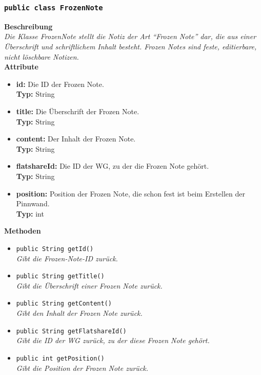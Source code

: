 \subsubsection{\texttt{public class FrozenNote}}

	\textbf{Beschreibung} \\
	\textit{Die Klasse FrozenNote stellt die Notiz der Art “Frozen Note” dar, die aus einer Überschrift und schriftlichem Inhalt besteht. Frozen Notes sind feste, editierbare, nicht löschbare Notizen.} \\
	
	\textbf{Attribute}
	\begin{itemize}
		\item \textbf{id:} Die ID der Frozen Note. \\
		\textbf{Typ:} String
		\item \textbf{title:} Die Überschrift der Frozen Note. \\
		\textbf{Typ:} String
		\item \textbf{content:} Der Inhalt der Frozen Note. \\
		\textbf{Typ:} String
		\item \textbf{flatshareId:} Die ID der WG, zu der die Frozen Note gehört. \\
		\textbf{Typ:} String
		\item \textbf{position:} Position der Frozen Note, die schon fest ist beim Erstellen der Pinnwand.\\
		\textbf{Typ:} int
	\end{itemize}
	
	\textbf{Methoden}
	\begin{itemize}
		\item\texttt{{public String getId()}}\\
		\textit{Gibt die Frozen-Note-ID zurück.}\\
		
		\item\texttt{{public String getTitle()}}\\
		\textit{Gibt die Überschrift einer Frozen Note zurück.}\\
		
		\item\texttt{{public String getContent()}}\\
		\textit{Gibt den Inhalt der Frozen Note zurück.}\\
		
		\item\texttt{{public String getFlatshareId()}}\\
		\textit{Gibt die ID der WG zurück, zu der diese Frozen Note gehört.}\\
		
		\item\texttt{{public int getPosition()}}\\
		\textit{Gibt die Position der Frozen Note zurück.}\\
	\end{itemize}

